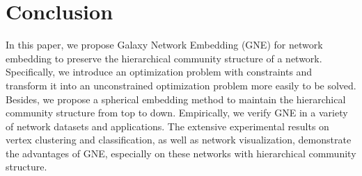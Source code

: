 \documentclass{article}
\theoremstyle{definition}
\begin{document}
 	\section{Conclusion}
 	In this paper, we propose Galaxy Network Embedding (GNE) for network embedding to preserve the hierarchical community structure of a network. 
 	Specifically, we introduce an optimization problem with constraints and transform it into an unconstrained optimization problem more easily to be solved. Besides, we propose a spherical embedding method to maintain the hierarchical community structure from top to down. 
 	Empirically, we verify GNE in a variety of network datasets and applications. The extensive experimental results on vertex clustering and classification, as well as network visualization, demonstrate the advantages of GNE, especially on these networks with hierarchical community structure.



\end{document}

